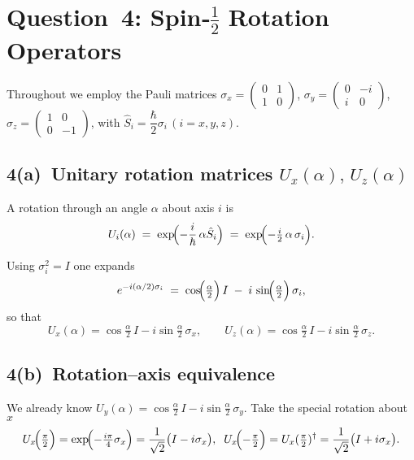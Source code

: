 \documentclass[12pt]{article}
\begin{document}
\section*{Question 4: Spin‑\(\tfrac12\) Rotation Operators}

Throughout we employ the Pauli matrices
\(\sigma_x=\begin{pmatrix}0&1\\1&0\end{pmatrix}\),
\(\sigma_y=\begin{pmatrix}0&-i\\ i&0\end{pmatrix}\),
\(\sigma_z=\begin{pmatrix}1&0\\0&-1\end{pmatrix}\),
with \(\hat S_i=\dfrac{\hbar}{2}\sigma_i\,(i=x,y,z).\)

\subsection*{4(a) Unitary rotation matrices \(U_x(\alpha),\,U_z(\alpha)\)}

A rotation through an angle \(\alpha\) about axis \(i\) is
\[
   U_i(\alpha)\;=\;
   \exp\!\Bigl(-\frac{i}{\hbar}\,\alpha\hat S_i\Bigr)
   \;=\;
   \exp\!\Bigl(-\tfrac{i}{2}\,\alpha\,\sigma_i\Bigr).
\]

Using \(\sigma_i^{2}=I\) one expands
\[
   e^{-i(\alpha/2)\sigma_i}
      \;=\;
      \cos\!\Bigl(\tfrac{\alpha}{2}\Bigr)\,I
      \;-\;
      i\,\sin\!\Bigl(\tfrac{\alpha}{2}\Bigr)\,\sigma_i,
\]
so that
\[
   \boxed{U_x(\alpha)=
          \cos\!\tfrac{\alpha}{2}\,I
          -i\sin\!\tfrac{\alpha}{2}\,\sigma_x},
   \qquad
   \boxed{U_z(\alpha)=
          \cos\!\tfrac{\alpha}{2}\,I
          -i\sin\!\tfrac{\alpha}{2}\,\sigma_z}.
\]

\subsection*{4(b) Rotation–axis equivalence}

We already know
\(
   U_y(\alpha)=
   \cos\!\tfrac{\alpha}{2}\,I
   -i\sin\!\tfrac{\alpha}{2}\,\sigma_y .
\)
Take the special rotation about \(x\)
\[
  U_x\!\Bigl(\tfrac{\pi}{2}\Bigr)
  =\exp\!\Bigl(-\tfrac{i\pi}{4}\sigma_x\Bigr)
  =\frac{1}{\sqrt2}\bigl(I-i\sigma_x\bigr),
  \;\;
  U_x\!\Bigl(-\tfrac{\pi}{2}\Bigr)=U_x(\tfrac{\pi}{2})^{\dagger}
  =\frac{1}{\sqrt2}\bigl(I+i\sigma_x\bigr).
\]
\end{document}
